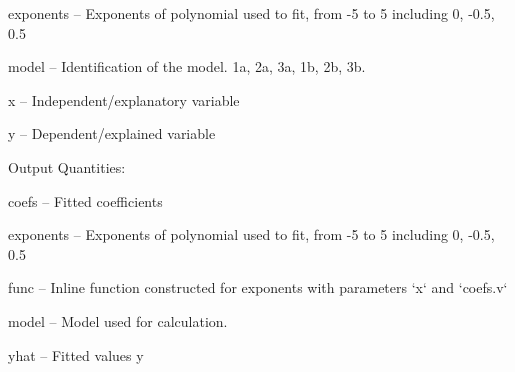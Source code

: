 \begin{tightdesc}
\begin{tightdesc}
        \begin{tightdesc}
            \item[\textsf{exponents}] -- Exponents of polynomial used to fit, from -5 to 5 including 0, -0.5, 0.5
            \item[\textsf{model}] -- Identification of the model. 1a, 2a, 3a, 1b, 2b, 3b.
            \item[\textsf{x}] -- Independent/explanatory variable
            \item[\textsf{y}] -- Dependent/explained variable
        \end{tightdesc}
    \end{tightdesc}
\item [Output Quantities:] \rule{0em}{0em}
    \begin{tightdesc}
        \item[\textsf{coefs}] -- Fitted coefficients
        \item[\textsf{exponents}] -- Exponents of polynomial used to fit, from -5 to 5 including 0, -0.5, 0.5
        \item[\textsf{func}] -- Inline function constructed for exponents with parameters `x` and `coefs.v`
        \item[\textsf{model}] -- Model used for calculation.
        \item[\textsf{yhat}] -- Fitted values y
    \end{tightdesc}
\end{tightdesc}
